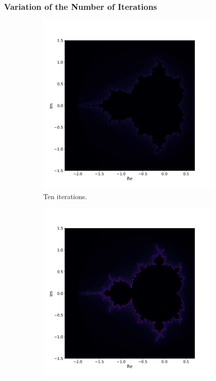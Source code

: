 \documentclass[
  12pt,					%
  a4paper,				%
  twoside,				%
]{report}
\begin{document}
\newpage
\subsubsection{Variation of the Number of Iterations}

\begin{figure}[H]
\centering
\begin{subfigure}{.45\textwidth}
  \centering
  \includegraphics[width=\linewidth]{IMG/It10.png}
  \caption{Ten iterations.}
\end{subfigure}%
\begin{subfigure}{.45\textwidth}
  \centering
  \includegraphics[width=\linewidth]{IMG/It25.png}

\end{subfigure}
\end{figure}
\end{document}
